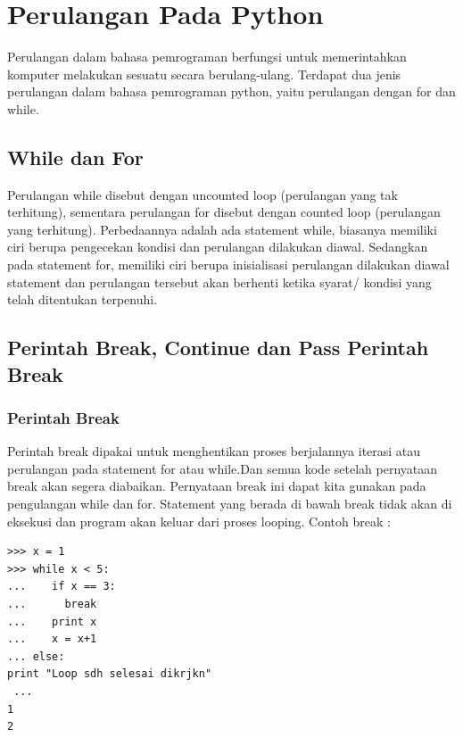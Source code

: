 
\section{Perulangan Pada Python}
Perulangan dalam bahasa pemrograman berfungsi untuk memerintahkan komputer melakukan sesuatu secara berulang-ulang. Terdapat dua jenis perulangan dalam bahasa pemrograman python, yaitu perulangan dengan for dan while.
\subsection{While dan For}
Perulangan while disebut dengan uncounted loop (perulangan yang tak terhitung), sementara perulangan for disebut dengan counted loop (perulangan yang terhitung). Perbedaannya adalah ada statement while, biasanya memiliki ciri berupa pengecekan kondisi dan perulangan dilakukan diawal. Sedangkan pada statement for, memiliki ciri berupa inisialisasi perulangan dilakukan diawal statement dan perulangan tersebut akan berhenti ketika syarat/ kondisi yang telah ditentukan terpenuhi\cite{santoso2009bahasa}.

\subsection{Perintah Break, Continue dan Pass Perintah Break}
\subsubsection{Perintah Break}
Perintah break dipakai untuk menghentikan proses berjalannya iterasi atau perulangan pada statement for atau while\cite{arfian2012rekayasa}.Dan semua kode setelah pernyataan break akan segera diabaikan. Pernyataan break ini dapat kita gunakan pada pengulangan while dan for.
Statement yang berada di bawah break tidak akan di eksekusi dan program akan keluar dari proses looping.  
Contoh break : 
\begin{verbatim}
>>> x = 1     
>>> while x < 5:     
...    if x == 3:     
...      break     
...    print x     
...    x = x+1                                                                                                                    
... else:          
print "Loop sdh selesai dikrjkn"   
 ...     
1    
2 
\end{verbatim}

